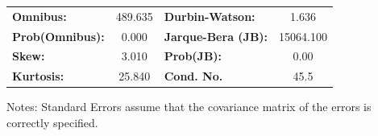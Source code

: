 \begin{center}
\begin{tabular}{lcccccc}
\bottomrule
\end{tabular}
\begin{tabular}{lclc}
\textbf{Omnibus:}       & 489.635 & \textbf{  Durbin-Watson:     } &     1.636  \\
\textbf{Prob(Omnibus):} &   0.000 & \textbf{  Jarque-Bera (JB):  } & 15064.100  \\
\textbf{Skew:}          &   3.010 & \textbf{  Prob(JB):          } &      0.00  \\
\textbf{Kurtosis:}      &  25.840 & \textbf{  Cond. No.          } &      45.5  \\
\bottomrule
\end{tabular}
\end{center}

Notes: \newline
 [1] Standard Errors assume that the covariance matrix of the errors is correctly specified.